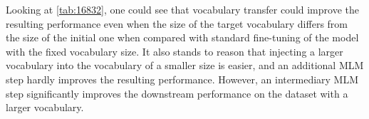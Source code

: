 \documentclass[review]{elsarticle}
\begin{document}
Looking at \ref{tab:16832}, one could see that vocabulary transfer could improve the resulting performance even when the size of the target vocabulary differs from the size of the initial one when compared with standard fine-tuning of the model with the fixed vocabulary size. It also stands to reason that injecting a larger vocabulary into the vocabulary of a smaller size is easier, and an additional MLM step hardly improves the resulting performance. However, an intermediary MLM step significantly improves the downstream performance on the dataset with a larger vocabulary.

\end{document}
